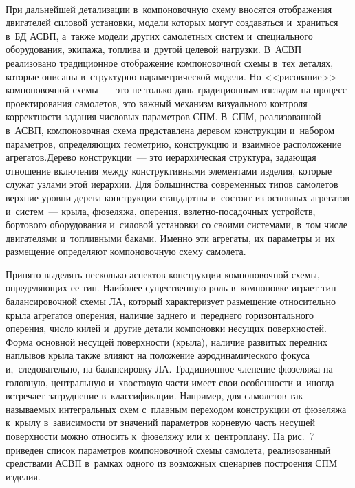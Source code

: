 \begin{multicols}{2}
\begin{figure*} %
\vspace*{1pt}
      \begin{center}
     \mbox{%
\epsfxsize=124.142mm 
}
\end{center}
\vspace*{-7pt}
\vspace*{5pt}
\end{figure*}

  При дальнейшей детализации в~компоновочную схему вносятся отображения 
двигателей силовой установки, модели которых могут создаваться и~храниться 
в~БД \mbox{АСВП}, а~так\-же модели \mbox{других} самолетных сис\-тем и~специального 
оборудования, экипажа, топ\-ли\-ва и~другой целевой на\-груз\-ки. В~\mbox{АСВП} 
реализовано традиционное отображение компоновочной схемы в~тех деталях, 
которые описаны в~струк\-тур\-но-па\-ра\-мет\-ри\-че\-ской модели. Но 
<<рисование>> компоновочной схемы~--- это не только дань традиционным 
взглядам на процесс проектирования самолетов, это важный механизм 
визуального контроля корректности задания чис\-ло\-вых па\-ра\-мет\-ров СПМ. 
В~СПМ, реализованной в~\mbox{АСВП}, 
компоновочная схема пред\-став\-ле\-на деревом конструкции и~набором 
па\-ра\-мет\-ров, опре\-де\-ля\-ющих гео\-мет\-рию, конструкцию и~взаимное расположение 
агрегатов.\linebreak Дерево конструкции~--- это иерархическая структура, за\-да\-ющая 
отношение включения между конструктивными элементами изделия, которые 
служат узлами этой иерархии. Для большинства \mbox{современных} типов самолетов 
верхние уровни дерева конструкции стандартны и~состоят из основных 
агрегатов и~сис\-тем~--- крыла, фюзеляжа, оперения, взлет\-но-по\-са\-доч\-ных 
устройств, бортового оборудования и~силовой установки со своими сис\-те\-ма\-ми, 
в~том числе двигателями и~топливными баками. Именно эти агрегаты, их 
параметры и~их размещение определяют компоновочную схему самолета. 

Принято выделять несколько аспектов конструкции компоновочной схемы, 
опре\-де\-ля\-ющих ее тип. Наиболее существенную роль в~компоновке играет тип 
балансировочной схемы ЛА, который характеризует размещение относительно 
крыла агрегатов оперения, наличие заднего и~переднего горизонтального 
оперения, чис\-ло килей и~другие детали компоновки несущих поверхностей. 
Форма основной несущей по\-верх\-ности (крыла), наличие развитых передних 
наплывов крыла так\-же влияют на положение аэродинамического фокуса 
и,~следовательно, на балансировку ЛА. Традиционное членение фюзеляжа на 
головную, цент\-раль\-ную и~хвос\-то\-вую части имеет свои особенности и~иногда 
встречает за\-труд\-не\-ние в~классификации. Например, для самолетов так 
называемых интегральных схем с~плав\-ным переходом конструкции от 
фюзеляжа к~крылу в~за\-ви\-си\-мости от значений па\-ра\-мет\-ров корневую часть 
несущей по\-верх\-ности мож\-но относить к~фюзеляжу или к~цент\-ро\-пла\-ну. На 
рис.~7 приведен список па\-ра\-мет\-ров компоновочной схемы самолета, 
реализованный средствами \mbox{АСВП} в~рамках одного из воз\-мож\-ных сценариев 
по\-стро\-ения СПМ изделия.




\end{multicols}
